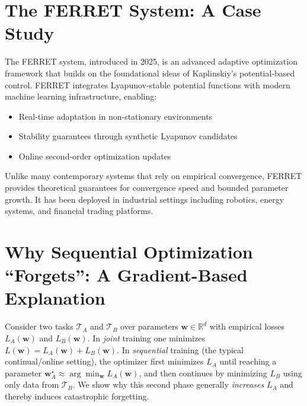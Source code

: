 \documentclass[12pt]{article}
\begin{document}
\section{The FERRET System: A Case Study}
The FERRET system, introduced in 2025, is an advanced adaptive optimization framework that builds on the foundational ideas of Kaplinskiy's potential-based control. FERRET integrates Lyapunov-stable potential functions with modern machine learning infrastructure, enabling:
\begin{itemize}
\item Real-time adaptation in non-stationary environments
\item Stability guarantees through synthetic Lyapunov candidates
\item Online second-order optimization updates
\end{itemize}
Unlike many contemporary systems that rely on empirical convergence, FERRET provides theoretical guarantees for convergence speed and bounded parameter growth. It has been deployed in industrial settings including robotics, energy systems, and financial trading platforms.

\section{Why Sequential Optimization ``Forgets'': A Gradient-Based Explanation}
\label{sec:forgetting-gradient-view}

Consider two tasks $\mathcal{T}_A$ and $\mathcal{T}_B$ over parameters $\mathbf{w}\in\mathbb{R}^d$
with empirical losses $L_A(\mathbf{w})$ and $L_B(\mathbf{w})$. In \emph{joint} training one minimizes
$L(\mathbf{w}) = L_A(\mathbf{w}) + L_B(\mathbf{w})$. In \emph{sequential} training (the typical
continual/online setting), the optimizer first minimizes $L_A$ until reaching a parameter
$\mathbf{w}_A^\star \approx \arg\min_{\mathbf{w}} L_A(\mathbf{w})$, and then continues by minimizing
$L_B$ using only data from $\mathcal{T}_B$. We show why this second phase generally \emph{increases}
$L_A$ and thereby induces catastrophic forgetting.
\end{document}
